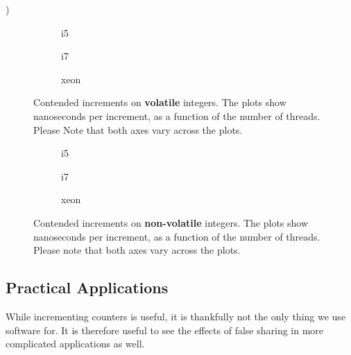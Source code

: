 )

\begin{figure}[hbpt]
	\graphicspath{{plots/}}
	\begin{subfigure}{0.5\textwidth}
		
		\caption{i5}
	\end{subfigure}
	\begin{subfigure}{0.5\textwidth}
		
		\caption{i7}
	\end{subfigure}
	\begin{subfigure}{1\textwidth}
		
		\caption{xeon}
	\end{subfigure}
	\caption{Contended increments on \textbf{volatile} integers. The plots show
	nanoseconds per increment, as a function of the number of threads.
	Please Note that both axes vary across the plots.}
	\label{fig:cont}
\end{figure}

\begin{figure}[hbpt]
	\graphicspath{{plots/}}
	\begin{subfigure}{0.5\textwidth}
		
		\caption{i5}
	\end{subfigure}
	\begin{subfigure}{0.5\textwidth}
		
		\caption{i7}
	\end{subfigure}
	\begin{subfigure}{1\textwidth}
		
		\caption{xeon}
	\end{subfigure}
	\caption{Contended increments on \textbf{non-volatile} integers. The
	plots show nanoseconds per increment, as a function of the number of
	threads. Please note that both axes vary across the plots.}
	\label{fig:cont-nob}
\end{figure}




\subsection{Practical Applications}
While incrementing counters is useful, it is thankfully not the only thing we
use software for. It is therefore useful to see the effects of false sharing in
more complicated applications as well.


